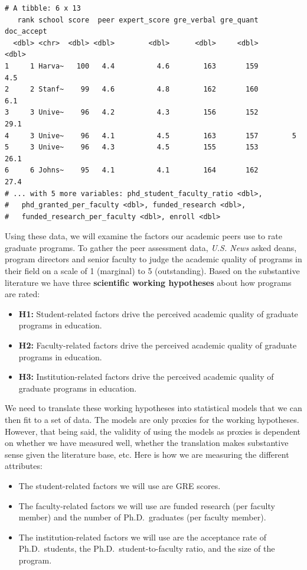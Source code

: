 \documentclass[]{book}
\providecommand{\tightlist}{%
  \setlength{\itemsep}{0pt}\setlength{\parskip}{0pt}}
\begin{document}
\begin{verbatim}
# A tibble: 6 x 13
   rank school score  peer expert_score gre_verbal gre_quant doc_accept
  <dbl> <chr>  <dbl> <dbl>        <dbl>      <dbl>     <dbl>      <dbl>
1     1 Harva~   100   4.4          4.6        163       159        4.5
2     2 Stanf~    99   4.6          4.8        162       160        6.1
3     3 Unive~    96   4.2          4.3        156       152       29.1
4     3 Unive~    96   4.1          4.5        163       157        5  
5     3 Unive~    96   4.3          4.5        155       153       26.1
6     6 Johns~    95   4.1          4.1        164       162       27.4
# ... with 5 more variables: phd_student_faculty_ratio <dbl>,
#   phd_granted_per_faculty <dbl>, funded_research <dbl>,
#   funded_research_per_faculty <dbl>, enroll <dbl>
\end{verbatim}

Using these data, we will examine the factors our academic peers use to rate graduate programs. To gather the peer assessment data, \emph{U.S. News} asked deans, program directors and senior faculty to judge the academic quality of programs in their field on a scale of 1 (marginal) to 5 (outstanding). Based on the substantive literature we have three \textbf{scientific working hypotheses} about how programs are rated:

\begin{itemize}
\tightlist
\item
  \textbf{H1:} Student-related factors drive the perceived academic quality of graduate programs in education.
\item
  \textbf{H2:} Faculty-related factors drive the perceived academic quality of graduate programs in education.
\item
  \textbf{H3:} Institution-related factors drive the perceived academic quality of graduate programs in education.
\end{itemize}

We need to translate these working hypotheses into statistical models that we can then fit to a set of data. The models are only proxies for the working hypotheses. However, that being said, the validity of using the models as proxies is dependent on whether we have measured well, whether the translation makes substantive sense given the literature base, etc. Here is how we are measuring the different attributes:

\begin{itemize}
\tightlist
\item
  The student-related factors we will use are GRE scores.
\item
  The faculty-related factors we will use are funded research (per faculty member) and the number of Ph.D.~graduates (per faculty member).
\item
  The institution-related factors we will use are the acceptance rate of Ph.D.~students, the Ph.D.~student-to-faculty ratio, and the size of the program.
\end{itemize}
\end{document}
